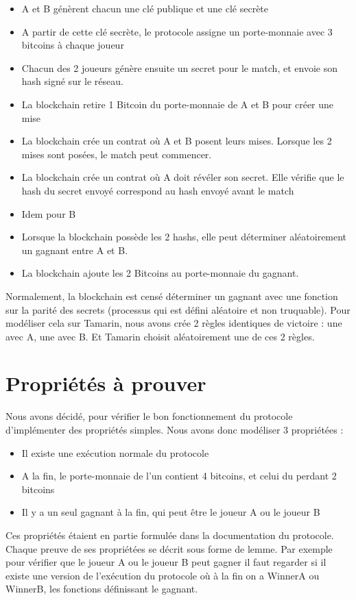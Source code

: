\documentclass[conference]{IEEEtran}
\begin{document}
\begin{itemize}
    \item A et B génèrent chacun une clé publique et une clé secrète
    \item A partir de cette clé secrète, le protocole assigne un porte-monnaie avec 3 bitcoins à chaque joueur
    \item Chacun des 2 joueurs génère ensuite un secret pour le match, et envoie son hash signé sur le réseau.
    \item La blockchain retire 1 Bitcoin du porte-monnaie de A et B pour créer une mise
    \item La blockchain crée un contrat où A et B posent leurs mises. Lorsque les 2 mises sont posées, le match peut commencer.
    \item La blockchain crée un contrat où A doit révéler son secret. Elle vérifie que le hash du secret envoyé correspond au hash envoyé avant le match
    \item Idem pour B
    \item Lorsque la blockchain possède les 2 hashs, elle peut déterminer aléatoirement un gagnant entre A et B.
    \item La blockchain ajoute les 2 Bitcoins au porte-monnaie du gagnant.
\end{itemize}

Normalement, la blockchain est censé déterminer un gagnant avec une fonction sur la parité des secrets (processus qui est défini aléatoire et non truquable). Pour modéliser cela sur Tamarin, nous avons crée 2 règles identiques de victoire : une avec A, une avec B. Et Tamarin choisit aléatoirement une de ces 2 règles.

\section{Propriétés à prouver}
Nous avons décidé, pour vérifier le bon fonctionnement du protocole d'implémenter des propriétés simples. Nous avons donc modéliser 3 propriétées :
\begin{itemize}
    \item Il existe une exécution normale du protocole
    \item A la fin, le porte-monnaie de l'un contient 4 bitcoins, et celui du perdant 2 bitcoins
    \item Il y a un seul gagnant à la fin, qui peut être le joueur A ou le joueur B \\
\end{itemize}
Ces propriétés étaient en partie formulée dans la documentation du protocole.
Chaque preuve de ses propriétées se décrit sous forme de lemme. Par exemple pour vérifier que le joueur A ou le joueur B peut gagner il faut regarder si il existe une version de l'exécution du protocole où à la fin on a WinnerA ou WinnerB, les fonctions définissant le gagnant.
\end{document}
